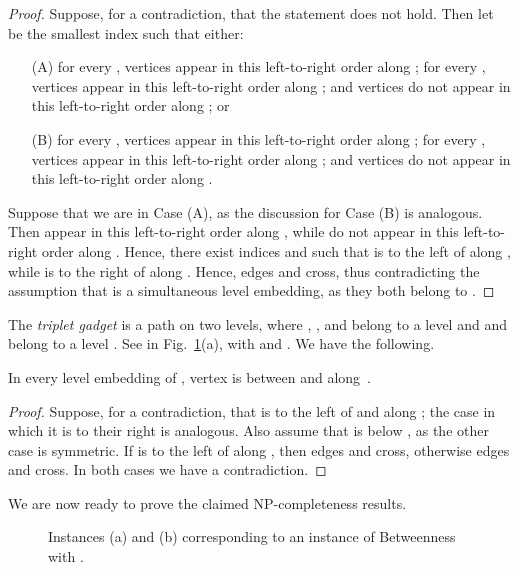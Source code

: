 \documentclass{llncs}
\newcommand{\Gb}[1]{\xspace}
\newcommand{\sefeinstance}[1]{\xspace}
\begin{document}
\begin{proof}
	Suppose, for a contradiction, that the statement does not hold. Then let  be the smallest index such that either: 
	
	\begin{itemize}
		\item[(A)] for every , vertices  appear in this left-to-right order along ; for every , vertices  appear in this left-to-right order along ; and vertices  do not appear in this left-to-right order along ; or 
		\item[(B)] for every , vertices  appear in this left-to-right order along ; for every , vertices  appear in this left-to-right order along ; and vertices  do not appear in this left-to-right order along .
	\end{itemize}
	
	Suppose that we are in Case (A), as the discussion for Case (B) is analogous. Then  appear in this left-to-right order along , while  do not appear in this left-to-right order along . Hence, there exist indices  and  such that  is to the left of  along , while  is to the right of  along . Hence, edges  and   cross, thus contradicting the assumption that  is a simultaneous level embedding, as they both belong to \Gb{}. 
\end{proof}


The {\em triplet gadget} is a path  on two levels, where , , and  belong to a level  and  and  belong to a level . See  in Fig.~\ref{fig:simultaneous-level}(a), with  and . We have the following.

\begin{lemma} \label{le:sl-triplet}
In every level embedding of , vertex  is between  and  along~.
\end{lemma} 

\begin{proof}
	Suppose, for a contradiction, that  is to the left of  and  along ; the case in which it is to their right is analogous. Also assume that  is below , as the other case is symmetric. If  is to the left of  along , then edges  and  cross, otherwise edges  and  cross. In both cases we have a contradiction.
\end{proof}

We are now ready to prove the claimed {\cal NP}-completeness results.

\begin{figure}[tb]
\centering
{} 
\caption{Instances (a)  and (b) \sefeinstance{} corresponding to an instance of {\sc Betweenness} with .} 
\label{fig:simultaneous-level}
\end{figure}
\end{document}
